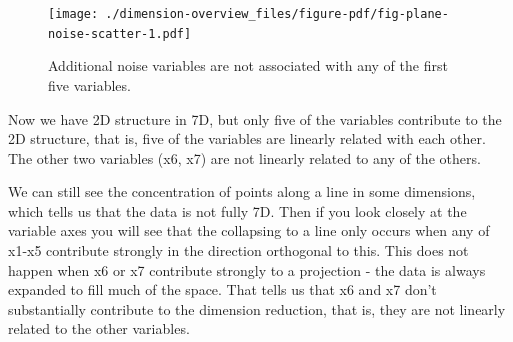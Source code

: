 \documentclass[
  letterpaper,
]{book}
\newenvironment{Shaded}{\begin{snugshade}}{\end{snugshade}}
\newcommand{\AttributeTok}[1]{\textcolor[rgb]{0.40,0.45,0.13}{#1}}
\newcommand{\CommentTok}[1]{\textcolor[rgb]{0.37,0.37,0.37}{#1}}
\newcommand{\ControlFlowTok}[1]{\textcolor[rgb]{0.00,0.23,0.31}{#1}}
\newcommand{\DecValTok}[1]{\textcolor[rgb]{0.68,0.00,0.00}{#1}}
\newcommand{\FunctionTok}[1]{\textcolor[rgb]{0.28,0.35,0.67}{#1}}
\newcommand{\NormalTok}[1]{\textcolor[rgb]{0.00,0.23,0.31}{#1}}
\newcommand{\OtherTok}[1]{\textcolor[rgb]{0.00,0.23,0.31}{#1}}
\newcommand{\SpecialCharTok}[1]{\textcolor[rgb]{0.37,0.37,0.37}{#1}}
\newcommand{\StringTok}[1]{\textcolor[rgb]{0.13,0.47,0.30}{#1}}
\begin{document}
\begin{Shaded}
\end{Shaded}

\begin{figure}[H]

{\centering \texttt{[image: ./dimension-overview\_files/figure-pdf/fig-plane-noise-scatter-1.pdf]}

}

\caption{\label{fig-plane-noise-scatter}Additional noise variables are
not associated with any of the first five variables.}

\end{figure}

Now we have 2D structure in 7D, but only five of the variables
contribute to the 2D structure, that is, five of the variables are
linearly related with each other. The other two variables (x6, x7) are
not linearly related to any of the others.

We can still see the concentration of points along a line in some
dimensions, which tells us that the data is not fully 7D. Then if you
look closely at the variable axes you will see that the collapsing to a
line only occurs when any of x1-x5 contribute strongly in the direction
orthogonal to this. This does not happen when x6 or x7 contribute
strongly to a projection - the data is always expanded to fill much of
the space. That tells us that x6 and x7 don't substantially contribute
to the dimension reduction, that is, they are not linearly related to
the other variables.
\end{document}
